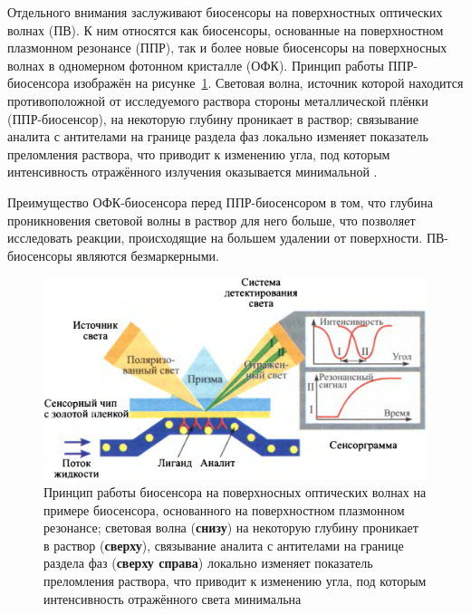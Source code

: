 \documentclass[oneside,final,12pt]{extreport}
\begin{document}
Отдельного внимания заслуживают биосенсоры на поверхностных оптических волнах (ПВ).
К ним относятся как биосенсоры, основанные на
поверхностном плазмонном резонансе (ППР)\cite{bib:lrspr_review,bib:spr_simultaneous,bib:spr_biodetection},
так и более новые биосенсоры на поверхносных волнах в
одномерном фотонном кристалле (ОФК)\cite{bib:odpc_visualization}.
Принцип работы ППР-биосенсора изображён на рисунке~\ref{fig:spr_biosensor_principle}.
Световая волна, источник которой находится противоположной от исследуемого раствора
стороны металлической плёнки (ППР-биосенсор), %
на некоторую глубину проникает в раствор;
связывание аналита с антителами на границе раздела фаз
локально изменяет показатель преломления раствора, что приводит к изменению
угла, под которым интенсивность отражённого излучения оказывается минимальной%
\cite{bib:klimov_nanoplasmonics}.

Преимущество ОФК-биосенсора перед ППР-биосенсором в том,
что глубина проникновения световой волны в раствор для него больше,
что позволяет исследовать реакции, происходящие
на большем удалении от поверхности.
ПВ-биосенсоры являются безмаркерными.


\begin{figure}
  \centering
  \includegraphics[width=.8\textwidth]{pic/spr_biosensor_principle}

  \caption{%
    \label{fig:spr_biosensor_principle}%
    Принцип работы биосенсора на поверхносных оптических волнах
    на примере биосенсора, основанного на поверхностном плазмонном резонансе;
    световая волна (\textbf{снизу}) на некоторую глубину проникает в раствор (\textbf{сверху}),
    связывание аналита с антителами на границе раздела фаз (\textbf{сверху справа})
    локально изменяет показатель преломления раствора, что приводит к изменению
    угла, под которым интенсивность отражённого света минимальна
  }

\end{figure}
\end{document}

